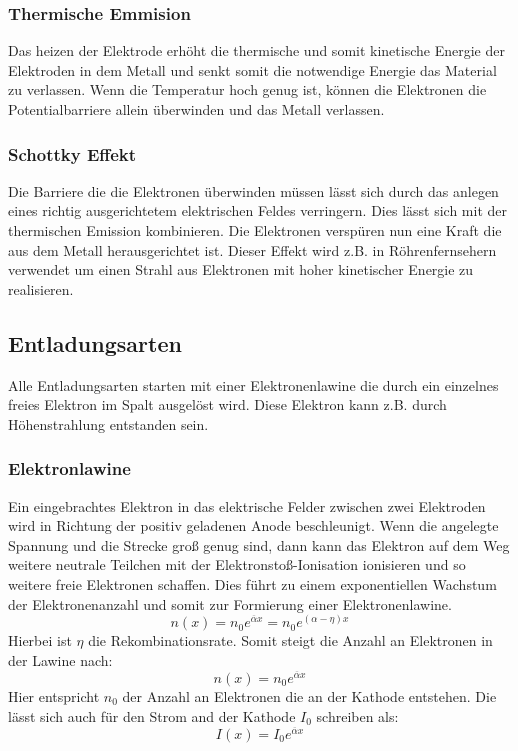 \subsubsection{Thermische Emmision}
Das heizen der Elektrode erhöht die thermische und somit kinetische Energie der Elektroden in dem Metall und senkt somit die notwendige Energie das Material zu verlassen. Wenn die Temperatur hoch genug ist, können die Elektronen die Potentialbarriere allein überwinden und das Metall verlassen.
\subsubsection{Schottky Effekt}
Die Barriere die die Elektronen überwinden müssen lässt sich durch das anlegen eines richtig ausgerichtetem elektrischen Feldes verringern. Dies lässt sich mit der thermischen Emission kombinieren. Die Elektronen verspüren nun eine Kraft die aus dem Metall herausgerichtet ist. Dieser Effekt wird z.B. in Röhrenfernsehern verwendet um einen Strahl aus Elektronen mit hoher kinetischer Energie zu realisieren. \cite{cooray2014}
\subsection{Entladungsarten}
Alle Entladungsarten starten mit einer Elektronenlawine die durch ein einzelnes freies Elektron im Spalt ausgelöst wird. Diese Elektron kann z.B. durch Höhenstrahlung entstanden sein.
\subsubsection{Elektronlawine}
\label{chap:electronlaw}
Ein eingebrachtes Elektron in das elektrische Felder zwischen zwei Elektroden wird in Richtung der positiv geladenen Anode beschleunigt. Wenn die angelegte Spannung und die Strecke groß genug sind, dann kann das Elektron auf dem Weg weitere neutrale Teilchen mit der Elektronstoß-Ionisation ionisieren und so weitere freie Elektronen schaffen. Dies führt zu einem exponentiellen Wachstum der Elektronenanzahl und somit zur Formierung einer Elektronenlawine. \cite{kuffel2000}
\begin{equation}
    n(x) = n_0 e^{\overline{\alpha}x} = n_0 e^{(\alpha - \eta)x}
    \label{eq:electronlaw}
\end{equation}
Hierbei ist \(\eta\) die Rekombinationsrate. Somit steigt die Anzahl an Elektronen in der Lawine nach:
\begin{equation}
    n(x) = n_0e^{\overline{\alpha}x}
\end{equation}
Hier entspricht \(n_0\) der Anzahl an Elektronen die an der Kathode entstehen. Die lässt sich auch für den Strom and der Kathode \(I_0\) schreiben als:
\begin{equation}
    I(x) = I_0e^{\overline{\alpha}x}
\end{equation}

